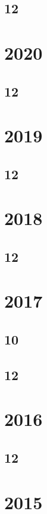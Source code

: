 \documentclass[11pt]{book}
\begin{document}
\subsection{12}

\section{2020}
\subsection{12}

\section{2019}
\subsection{12}





\section{2018}
\subsection{12}




\section{2017}
\subsection{10}

\subsection{12}


\section{2016}
\subsection{12}


\section{2015}
\end{document}

